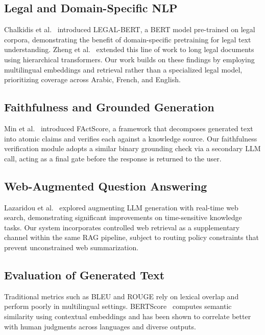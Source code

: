 \documentclass[12pt, a4paper]{article}
\begin{document}
\subsection{Legal and Domain-Specific NLP}

Chalkidis et al.~\cite{chalkidis2020legalbert} introduced LEGAL-BERT, a BERT
model pre-trained on legal corpora, demonstrating the benefit of domain-specific
pretraining for legal text understanding. Zheng et al.~\cite{zheng2021lawformer}
extended this line of work to long legal documents using hierarchical
transformers. Our work builds on these findings by employing multilingual
embeddings and retrieval rather than a specialized legal model, prioritizing
coverage across Arabic, French, and English.

\subsection{Faithfulness and Grounded Generation}

Min et al.~\cite{min2023factscore} introduced FActScore, a framework that
decomposes generated text into atomic claims and verifies each against a
knowledge source. Our faithfulness verification module adopts a similar
binary grounding check via a secondary LLM call, acting as a final gate
before the response is returned to the user.

\subsection{Web-Augmented Question Answering}

Lazaridou et al.~\cite{lazaridou2022internetaugmented} explored augmenting LLM
generation with real-time web search, demonstrating significant improvements on
time-sensitive knowledge tasks. Our system incorporates controlled web retrieval
as a supplementary channel within the same RAG pipeline, subject to routing
policy constraints that prevent unconstrained web summarization.

\subsection{Evaluation of Generated Text}

Traditional metrics such as BLEU and ROUGE rely on lexical overlap and perform
poorly in multilingual settings. BERTScore~\cite{zhang2020bertscore} computes
semantic similarity using contextual embeddings and has been shown to correlate
better with human judgments across languages and diverse outputs.
\end{document}
